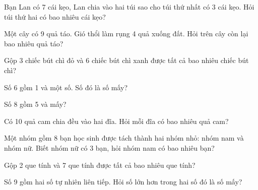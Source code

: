 \begin{ex}
Bạn Lan có 7 cái kẹo, Lan chia vào hai túi sao cho túi thứ nhất có 3 cái kẹo. Hỏi túi thứ hai có bao nhiêu cái kẹo?
\end{ex}

\begin{ex}
Một cây có 9 quả táo. Gió thổi làm rụng 4 quả xuống đất. Hỏi trên cây còn lại bao nhiêu quả táo?
\end{ex}

\begin{ex}
Gộp 3 chiếc bút chì đỏ và 6 chiếc bút chì xanh được tất cả bao nhiêu chiếc bút chì?
\end{ex}

\begin{ex}
Số 6 gồm 1 và một số. Số đó là số mấy?
\end{ex}

\begin{ex}
Số 8 gồm 5 và mấy?
\end{ex}

\begin{ex}
Có 10 quả cam chia đều vào hai đĩa. Hỏi mỗi đĩa có bao nhiêu quả cam?
\end{ex}

\begin{ex}
Một nhóm gồm 8 bạn học sinh được tách thành hai nhóm nhỏ: nhóm nam và nhóm nữ. Biết nhóm nữ có 3 bạn, hỏi nhóm nam có bao nhiêu bạn?
\end{ex}

\begin{ex}
Gộp 2 que tính và 7 que tính được tất cả bao nhiêu que tính?
\end{ex}

\begin{ex}
Số 9 gồm hai số tự nhiên liên tiếp. Hỏi số lớn hơn trong hai số đó là số mấy?
\end{ex}

